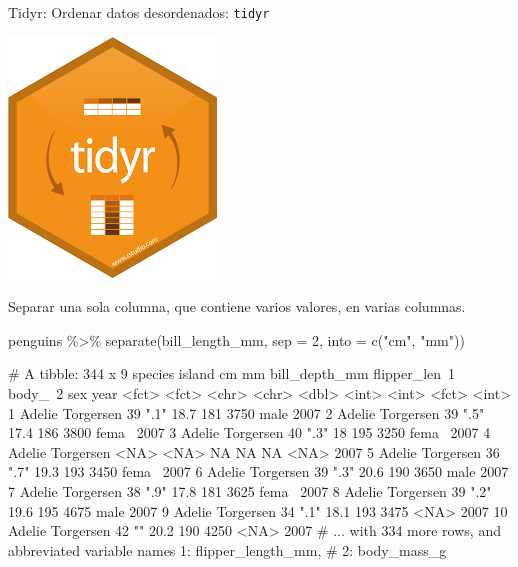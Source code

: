 \documentclass[
  ignorenonframetext,
  aspectratio=169]{beamer}
\newenvironment{Shaded}{\begin{snugshade}}{\end{snugshade}}
\newcommand{\AttributeTok}[1]{\textcolor[rgb]{0.77,0.63,0.00}{#1}}
\newcommand{\DecValTok}[1]{\textcolor[rgb]{0.00,0.00,0.81}{#1}}
\newcommand{\FunctionTok}[1]{\textcolor[rgb]{0.00,0.00,0.00}{#1}}
\newcommand{\NormalTok}[1]{#1}
\newcommand{\SpecialCharTok}[1]{\textcolor[rgb]{0.00,0.00,0.00}{#1}}
\newcommand{\StringTok}[1]{\textcolor[rgb]{0.31,0.60,0.02}{#1}}
\let\oldverbatim\verbatim
\let\endoldverbatim\endverbatim
\renewenvironment{verbatim}{\tiny\oldverbatim}{\endoldverbatim}
\begin{document}
\begin{frame}[fragile]{Tidyr: Ordenar datos desordenados:
\texttt{tidyr}}
\protect\hypertarget{tidyr-ordenar-datos-desordenados-tidyr-8}{}
\begin{flushright}\includegraphics[width=0.05\linewidth]{Imgs/logo_tidyr} \end{flushright}

Separar una sola columna, que contiene varios valores, en varias
columnas.

\begin{Shaded}
\begin{Highlighting}[]
\NormalTok{penguins }\SpecialCharTok{\%\textgreater{}\%} \FunctionTok{separate}\NormalTok{(bill\_length\_mm, }\AttributeTok{sep =} \DecValTok{2}\NormalTok{, }\AttributeTok{into =} \FunctionTok{c}\NormalTok{(}\StringTok{"cm"}\NormalTok{, }\StringTok{"mm"}\NormalTok{))}
\end{Highlighting}
\end{Shaded}

\begin{verbatim}
# A tibble: 344 x 9
   species island    cm    mm    bill_depth_mm flipper_len~1 body_~2 sex    year
   <fct>   <fct>     <chr> <chr>         <dbl>         <int>   <int> <fct> <int>
 1 Adelie  Torgersen 39    ".1"           18.7           181    3750 male   2007
 2 Adelie  Torgersen 39    ".5"           17.4           186    3800 fema~  2007
 3 Adelie  Torgersen 40    ".3"           18             195    3250 fema~  2007
 4 Adelie  Torgersen <NA>  <NA>           NA              NA      NA <NA>   2007
 5 Adelie  Torgersen 36    ".7"           19.3           193    3450 fema~  2007
 6 Adelie  Torgersen 39    ".3"           20.6           190    3650 male   2007
 7 Adelie  Torgersen 38    ".9"           17.8           181    3625 fema~  2007
 8 Adelie  Torgersen 39    ".2"           19.6           195    4675 male   2007
 9 Adelie  Torgersen 34    ".1"           18.1           193    3475 <NA>   2007
10 Adelie  Torgersen 42    ""             20.2           190    4250 <NA>   2007
# ... with 334 more rows, and abbreviated variable names 1: flipper_length_mm,
#   2: body_mass_g
\end{verbatim}
\end{frame}
\end{document}
